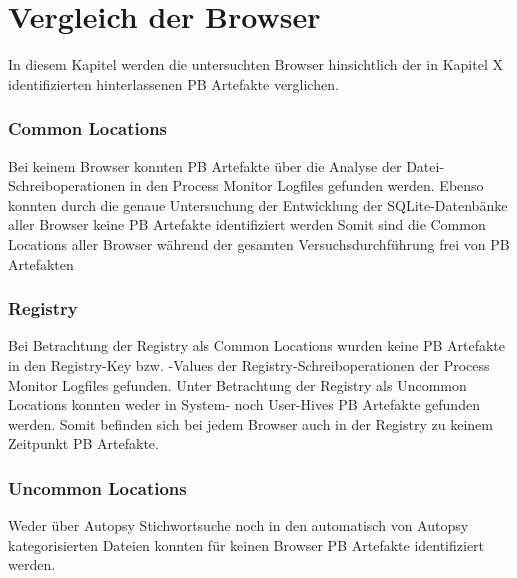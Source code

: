 \chapter{Vergleich der Browser}
\label{chapter:vergleich-der-browser}

In diesem Kapitel werden die untersuchten Browser hinsichtlich der in Kapitel X identifizierten hinterlassenen PB Artefakte verglichen.

\subsection*{Common Locations}
Bei keinem Browser konnten PB Artefakte über die Analyse der Datei-Schreiboperationen in den Process Monitor Logfiles gefunden werden.
Ebenso konnten durch die genaue Untersuchung der Entwicklung der SQLite-Datenbänke aller Browser keine PB Artefakte identifiziert werden 
Somit sind die Common Locations aller Browser während der gesamten Versuchsdurchführung frei von PB Artefakten

\subsection*{Registry}
Bei Betrachtung der Registry als Common Locations wurden keine PB Artefakte in den Registry-Key bzw. -Values der Registry-Schreiboperationen der Process Monitor Logfiles gefunden.
Unter Betrachtung der Registry als Uncommon Locations konnten weder in System- noch User-Hives PB Artefakte gefunden werden.
Somit befinden sich bei jedem Browser auch in der Registry zu keinem Zeitpunkt PB Artefakte.



\subsection*{Uncommon Locations}
Weder über Autopsy Stichwortsuche noch in den automatisch von Autopsy kategorisierten Dateien konnten für keinen Browser PB Artefakte identifiziert werden.

